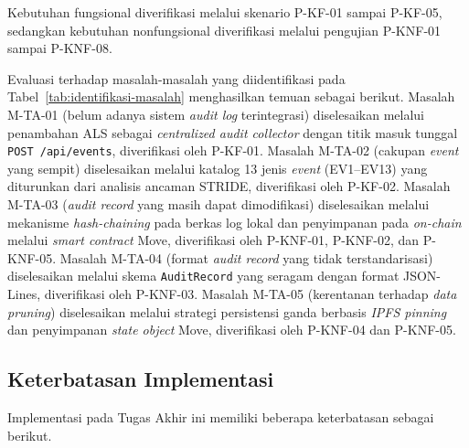 Kebutuhan fungsional diverifikasi melalui skenario P-KF-01 sampai P-KF-05, sedangkan kebutuhan nonfungsional diverifikasi melalui pengujian P-KNF-01 sampai P-KNF-08.

Evaluasi terhadap masalah-masalah yang diidentifikasi pada Tabel~\ref{tab:identifikasi-masalah} menghasilkan temuan sebagai berikut. Masalah M-TA-01 (belum adanya sistem \textit{audit log} terintegrasi) diselesaikan melalui penambahan ALS sebagai \textit{centralized audit collector} dengan titik masuk tunggal \texttt{POST /api/events}, diverifikasi oleh P-KF-01. Masalah M-TA-02 (cakupan \textit{event} yang sempit) diselesaikan melalui katalog 13 jenis \textit{event} (EV1--EV13) yang diturunkan dari analisis ancaman STRIDE, diverifikasi oleh P-KF-02. Masalah M-TA-03 (\textit{audit record} yang masih dapat dimodifikasi) diselesaikan melalui mekanisme \textit{hash-chaining} pada berkas log lokal dan penyimpanan pada \textit{on-chain} melalui \textit{smart contract} Move, diverifikasi oleh P-KNF-01, P-KNF-02, dan P-KNF-05. Masalah M-TA-04 (format \textit{audit record} yang tidak terstandarisasi) diselesaikan melalui skema \texttt{AuditRecord} yang seragam dengan format JSON-Lines, diverifikasi oleh P-KNF-03. Masalah M-TA-05 (kerentanan terhadap \textit{data pruning}) diselesaikan melalui strategi persistensi ganda berbasis \textit{IPFS pinning} dan penyimpanan \textit{state object} Move, diverifikasi oleh P-KNF-04 dan P-KNF-05.

\subsection{Keterbatasan Implementasi}
\label{subsec:keterbatasan-implementasi}

Implementasi pada Tugas Akhir ini memiliki beberapa keterbatasan sebagai berikut.

